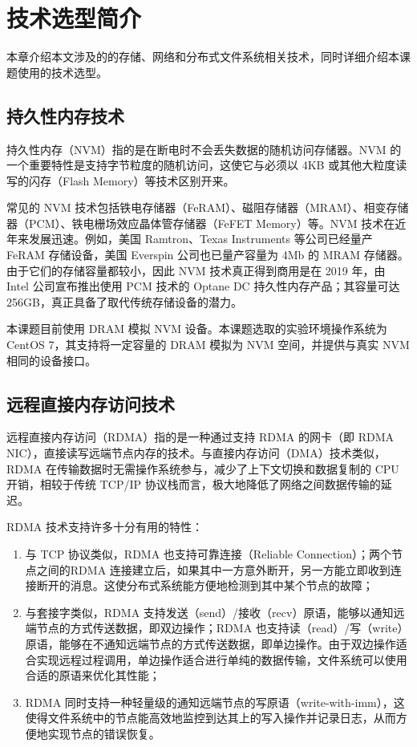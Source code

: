 
\chapter{技术选型简介}
\label{cha:tech}


本章介绍本文涉及的的存储、网络和分布式文件系统相关技术，同时详细介绍本课题使用的技术选型。

\section{持久性内存技术}
\label{ch2_nvm}

持久性内存（NVM）指的是在断电时不会丢失数据的随机访问存储器。NVM 的一个重要特性是支持字节粒度的随机访问，这使它与必须以 4KB 或其他大粒度读写的闪存（Flash Memory）等技术区别开来。

常见的 NVM 技术包括铁电存储器（FeRAM）、磁阻存储器（MRAM）、相变存储器（PCM）、铁电栅场效应晶体管存储器（FeFET Memory）等。NVM 技术在近年来发展迅速。例如，美国 Ramtron、Texas Instruments 等公司已经量产 FeRAM 存储设备，美国 Everspin 公司也已量产容量为 4Mb 的 MRAM 存储器。由于它们的存储容量都较小，因此 NVM 技术真正得到商用是在 2019 年，由 Intel 公司宣布推出使用 PCM 技术的 Optane DC 持久性内存产品；其容量可达 256GB，真正具备了取代传统存储设备的潜力。

本课题目前使用 DRAM 模拟 NVM 设备。本课题选取的实验环境操作系统为 CentOS 7，其支持将一定容量的 DRAM 模拟为 NVM 空间，并提供与真实 NVM 相同的设备接口。

\section{远程直接内存访问技术}
\label{ch2_rdma}

远程直接内存访问（RDMA）指的是一种通过支持 RDMA 的网卡（即 RDMA NIC），直接读写远端节点内存的技术。与直接内存访问（DMA）技术类似，RDMA 在传输数据时无需操作系统参与，减少了上下文切换和数据复制的 CPU 开销，相较于传统 TCP/IP 协议栈而言，极大地降低了网络之间数据传输的延迟。

RDMA 技术支持许多十分有用的特性：

\begin{enumerate}[(1)]

    \item 与 TCP 协议类似，RDMA 也支持可靠连接（Reliable Connection）；两个节点之间的RDMA 连接建立后，如果其中一方意外断开，另一方能立即收到连接断开的消息。这使分布式系统能方便地检测到其中某个节点的故障；
    \item 与套接字类似，RDMA 支持发送（send）/接收（recv）原语，能够以通知远端节点的方式传送数据，即双边操作；RDMA 也支持读（read）/写（write）原语，能够在不通知远端节点的方式传送数据，即单边操作。由于双边操作适合实现远程过程调用，单边操作适合进行单纯的数据传输，文件系统可以使用合适的原语来优化其性能；
    \item RDMA 同时支持一种轻量级的通知远端节点的写原语（write-with-imm），这使得文件系统中的节点能高效地监控到达其上的写入操作并记录日志，从而方便地实现节点的错误恢复。

\end{enumerate}

